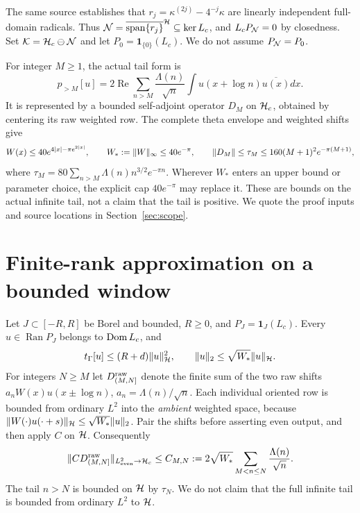 \documentclass[11pt]{article}
\begin{document}
The same source establishes that $r_j=\kappa^{(2j)}-4^{-j}\kappa$ are linearly independent full-domain radicals. Thus $\mathcal N=\overline{\operatorname{span}\{r_j\}}^{\mathcal H}\subseteq\ker L_c$, and $L_cP_\mathcal N=0$ by closedness. Set $\mathcal K=\mathcal H_c\ominus\mathcal N$ and let $P_0=\mathbf 1_{\{0\}}(L_c)$. We do not assume $P_\mathcal N=P_0$.

For integer $M\ge1$, the actual tail form is
\[p_{>M}[u]=2\operatorname{Re}\sum_{n>M}\frac{\Lambda(n)}{\sqrt n}\int u(x+\log n)\overline{u(x)}dx.\]
It is represented by a bounded self-adjoint operator $D_M$ on $\mathcal H_c$, obtained by centering its raw weighted row. The complete theta envelope and weighted shifts give \cite{indexnote}
\begin{equation}\label{tail}
 W(x)\le40e^{4|x|-\pi e^{2|x|}},\qquad W_*:=\lVert W\rVert_\infty\le40e^{-\pi},\qquad
 \lVert D_M\rVert\le\tau_M\le160(M+1)^2e^{-\pi(M+1)},
\end{equation}
where $\tau_M=80\sum_{n>M}\Lambda(n)n^{3/2}e^{-\pi n}$. Wherever $W_*$ enters an upper bound or parameter choice, the explicit cap $40e^{-\pi}$ may replace it. These are bounds on the actual infinite tail, not a claim that the tail is positive. We quote the proof inputs and source locations in Section~\ref{sec:scope}.

\section{Finite-rank approximation on a bounded window}\label{sec:approx}
Let $J\subset[-R,R]$ be Borel and bounded, $R\ge0$, and $P_J=\mathbf1_J(L_c)$. Every $u\in\operatorname{Ran}P_J$ belongs to $\operatorname{Dom} L_c$, and
\begin{equation}\label{energy}
 t_\Gamma[u]\le(R+d)\lVert u\rVert_{\mathcal H}^2,\qquad \lVert u\rVert_2\le\sqrt{W_*}\lVert u\rVert_{\mathcal H}.
\end{equation}
For integers $N\ge M$ let $D_{(M,N]}^{\rm raw}$ denote the finite sum of the two raw shifts $a_nW(x)u(x\pm\log n)$, $a_n=\Lambda(n)/\sqrt n$. Each individual oriented row is bounded from ordinary $L^2$ into the \emph{ambient} weighted space, because $\lVert W(\cdot)u(\cdot+s)\rVert_{\mathcal H}\le\sqrt{W_*}\lVert u\rVert_2$. Pair the shifts before asserting even output, and then apply $C$ on $\mathcal H$. Consequently
\begin{equation}\label{Cmn}
 \lVert C D_{(M,N]}^{\rm raw}\rVert_{L^2_{\rm even}\to\mathcal H_c}\le C_{M,N}:=2\sqrt{W_*}\sum_{M<n\le N}\frac{\Lambda(n)}{\sqrt n}.
\end{equation}
The tail $n>N$ is bounded on $\mathcal H$ by $\tau_N$. We do not claim that the full infinite tail is bounded from ordinary $L^2$ to $\mathcal H$.
\end{document}
